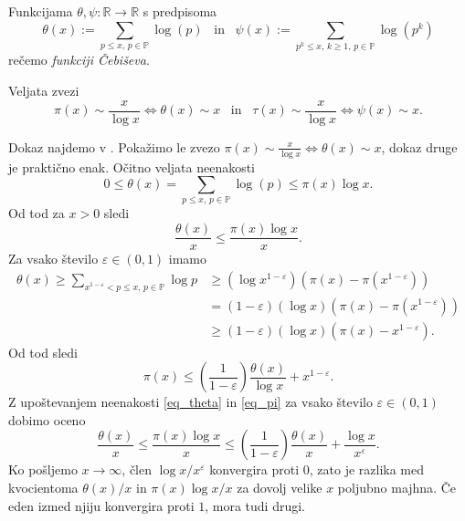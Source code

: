 \begin{definicija}
\label{def_cebisevi_funkciji}
Funkcijama $\theta, \psi : \mathbb{R} \to \mathbb{R}$ s predpisoma \begin{equation*}
\theta(x) := \sum_{p \le x, \,   p \in \mathbb{P}} \log(p) \,\,\, \text{ in } \,\,\, \psi(x) := \sum_{p^{k} \le x, \,  k \ge  1 , \,   p \in \mathbb{P}} \log(p^k)
\end{equation*}  
rečemo \emph{funkciji Čebiševa}.
\end{definicija}

\begin{izrek}[Čebišev]
\label{izr_cebisov}
  Veljata zvezi \begin{equation*}
  \pi(x) \sim \frac{x}{\log x} \iff \theta(x) \sim x  \,\,\, \text{ in } \,\,\, \tau(x) \sim \frac{x}{\log x} \iff \psi(x) \sim x.
  \end{equation*} 
\end{izrek}
\begin{dokaz}
Dokaz najdemo v \cite[str.~4]{mit_lecture_notes_2021}. 
Pokažimo le zvezo $\pi(x) \sim \frac{x}{\log x} \iff \theta(x) \sim x$, dokaz druge je praktično enak. Očitno veljata neenakosti \begin{equation*}
  0 \le  \theta(x) = \sum_{p \le x, \,   p \in \mathbb{P}} \log(p) \le  \pi(x) \log x.
\end{equation*}  
Od tod za $x > 0$ sledi \begin{equation}\label{eq_theta}
  \frac{\theta(x)}{x} \le  \frac{\pi(x) \log x}{x}. 
  \end{equation} 
  Za vsako število $\varepsilon \in  (0,1)$ imamo \begin{align*}
    \theta(x) \geq \sum_{x^{1-\varepsilon} < p \leq x, \, p \in \mathbb{P}} \log p &\geq (\log x^{1-\varepsilon})\left(\pi(x) - \pi(x^{1-\varepsilon})\right) \\
    &= (1-\varepsilon)(\log x)\left(\pi(x) - \pi(x^{1-\varepsilon})\right) \\
     &\geq (1-\varepsilon)(\log x)(\pi(x) - x^{1-\varepsilon}).
  \end{align*}
  Od tod sledi \begin{equation}\label{eq_pi}
    \pi(x) \leq \left(\frac{1}{1-\varepsilon}\right)\frac{\theta(x)}{\log x} + x^{1-\varepsilon}.
  \end{equation}  
  Z upoštevanjem neenakosti \ref{eq_theta} in \ref{eq_pi} za vsako število $\varepsilon \in  (0,1)$ dobimo oceno \begin{equation*}
    \frac{\theta(x)}{x} \leq \frac{\pi(x)\log x}{x} \leq \left(\frac{1}{1-\varepsilon}\right)\frac{\theta(x)}{x} + \frac{\log x}{x^{\varepsilon}}.
  \end{equation*}  
  Ko pošljemo $x \to \infty$, člen $\log x / x^{\varepsilon}$ konvergira proti 0, zato je razlika med kvocientoma $\theta(x) / x$ in $\pi(x) \log x / x$ za dovolj velike $x$ poljubno majhna.
  Če eden izmed njiju konvergira proti $1$, mora tudi drugi.
\end{dokaz}
